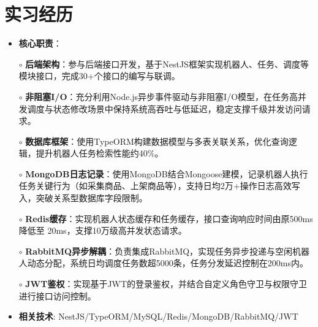 \section{实习经历}
    \begin{normalsize}
      \begin{itemize}
        \item \textbf{核心职责}：
        \setlength{\itemindent}{1em} %
          \item[$\circ$] \textbf{后端架构}：参与后端接口开发，基于NestJS框架实现机器人、任务、调度等模块接口，完成30+个接口的编写与联调。
          \item[$\circ$] \textbf{非阻塞I/O}：充分利用Node.js异步事件驱动与非阻塞I/O模型，在任务高并发调度与状态修改场景中保持系统高吞吐与低延迟，稳定支撑千级并发访问请求。
          \item[$\circ$] \textbf{数据库框架}：使用TypeORM构建数据模型与多表关联关系，优化查询逻辑，提升机器人任务检索性能约40\%。
          \item[$\circ$] \textbf{MongoDB日志记录}：使用MongoDB结合Mongoose建模，记录机器人执行任务关键行为（如采集商品、上架商品等），支持日均2万+操作日志高效写入，突破关系型数据库字段限制。
          \item[$\circ$] \textbf{Redis缓存}：实现机器人状态缓存和任务缓存，接口查询响应时间由原500ms降低至 20ms，支撑10万级高并发状态请求。
          \item[$\circ$] \textbf{RabbitMQ异步解耦​​}：负责集成RabbitMQ，实现任务异步投递与空闲机器人动态分配，系统日均调度任务数超5000条，任务分发延迟控制在200ms内。
          \item[$\circ$] \textbf{JWT鉴权}：实现基于JWT的登录鉴权，并结合自定义角色守卫与权限守卫进行接口访问控制。
        \setlength{\itemindent}{0em} %
        \item \textbf{相关技术}: NestJS/TypeORM/MySQL/Redis/MongoDB/RabbitMQ/JWT
        \end{itemize}
    \end{normalsize}